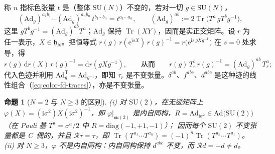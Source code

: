 \documentclass[UTF8,a4paper,11pt,fontset=fandol]{ctexart}
\theoremstyle{cplain}
\newtheorem{proposition}[theorem]{命题}
\theoremstyle{cdefinition}
\theoremstyle{cremark}
\numberwithin{equation}{section}
\DeclareMathOperator{\Tr}{Tr}
\newcommand{\dd}{\mathrm{d}}                         %
\newcommand{\tp}{\mathsf{T}}                         %
\newcommand{\Rop}{\mathcal{R}}                       %
\newcommand{\su}{\mathfrak{su}}
\newcommand{\ii}{\mathrm{i}}                        %
\newcommand{\ee}{\mathrm{e}}                        %
\begin{document}
称 $n$ 指标色张量 $t$ 是（整体 $\mathrm{SU}(N)$）不变的，若对一切 $g\in\mathrm{SU}(N)$，
\begin{equation}\label{eq:color-invariance}
(\mathrm{Ad}_g)^{a_1b_1}\cdots(\mathrm{Ad}_g)^{a_nb_n}\,t^{b_1\cdots b_n}=t^{a_1\cdots a_n},\qquad (\mathrm{Ad}_g)^{ab}:=2\Tr\bigl(T^a\,gT^bg^{-1}\bigr),
\end{equation}
这里 $gT^bg^{-1}=(\mathrm{Ad}_g)^{ab}T^a$；$\mathrm{Ad}_g$ 保持 $\Tr(XY)$，因而是实正交矩阵。设 $r$ 为任一表示，$X\in\mathfrak h_N$。把恒等式
$r(g)\,r(\ee^{\ii sX})\,r(g)^{-1}=r\bigl(\ee^{\ii s\,gXg^{-1}}\bigr)$ 在 $s=0$ 处求导，得
\[
r(g)\,\dd r(X)\,r(g)^{-1}=\dd r(gXg^{-1}),\qquad\text{从而}\qquad r(g)\,T_r^b\,r(g)^{-1}=(\mathrm{Ad}_g)^{ab}\,T_r^a ;
\]
代入色迹并利用 $\mathrm{Ad}_g^{\tp}=\mathrm{Ad}_{g^{-1}}$，即知 $\tau_r$ 是不变张量。$\delta^{ab}$、$f^{abc}$、$d^{abc}$ 是这种迹的线性组合（\cref{eq:color-fd-traces}），亦是不变张量。

\begin{proposition}[$N=2$ 与 $N\ge3$ 的区别]\label{prop:su2}
(i) 对 $\mathrm{SU}(2)$，在无迹矩阵上 $\varphi(X)=(\ii\sigma^2)X(\ii\sigma^2)^{-1}$，即 $\varphi|_{\su(2)}$ 是内自同构，$R=\mathrm{Ad}_{\ii\sigma^2}\in\mathrm{Ad}\bigl(\mathrm{SU}(2)\bigr)$（在 Pauli 基 $T^a=\sigma^a/2$ 中 $R=\mathrm{diag}(-1,+1,-1)$）；
因而每个 $\mathrm{SU}(2)$ 不变张量都是 C~偶的，并且 $\Rop\tau=\tau$，即 $\Tr(T^{a_1}\cdots T^{a_n})=(-1)^n\Tr(T^{a_n}\cdots T^{a_1})$。
(ii) 对 $N\ge3$，$\varphi$ 不是内自同构：内自同构保持 $d^{abc}$ 不变，而 $\Rop d=-d\neq d$。
\end{proposition}
\end{document}
